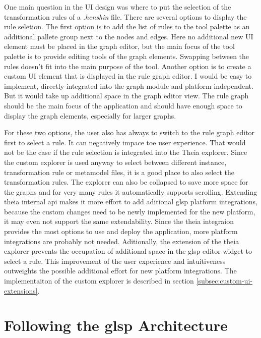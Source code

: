     One main question in the UI design was where to put the selection of the transformation rules of a \textit{.henshin} file. There are several options to display the rule seletion. The first option is to add the list of rules to the tool palette as an additional pallete group next to the nodes and edges. Here no additional new UI element must be placed in the graph editor, but the main focus of the tool palette is to provide editing tools of the graph elements. Swapping between the rules doesn't fit into the main purpose of the tool. Another option is to create a custom UI element that is displayed in the rule graph editor. I would be easy to implement, directly integrated into the graph module and platform independent. But it would take up additional space in the graph editor view. The rule graph should be the main focus of the application and should have enough space to display the graph elements, especially for larger graphs.

    For these two options, the user also has always to switch to the rule graph editor first to select a rule. It can negatively impace toe user experience. That would not be the case if the rule selection is integrated into the Theia explorer. Since the custom explorer is used anyway to select between different instance, transformation rule or metamodel files, it is a good place to also select the transformation rules. The explorer can also be collapsed to save more space for the graphs and for very many rules it automatically supports scrolling. Extending theia internal \acs{api} makes it more effort to add aditional \ac{glsp} platform integrations, because the custom changes need to be newly implemented for the new platform, it may even not support the same extendability. Since the theia integraion provides the most options to use and deploy the application, more platform integrations are probably not needed. Aditionally, the extension of the theia explorer prevents the occupation of additional space in the \ac{glsp} editor widget to select a rule. This improvement of the user experience and intuitiveness outweights the possible additional effort for new platform integrations. The implementaiton of the custom explorer is described in section \ref{subsec:custom-ui-extensions}.


 \section{Following the \ac{glsp} Architecture}
  \label{subsec:high-level-architecture}

